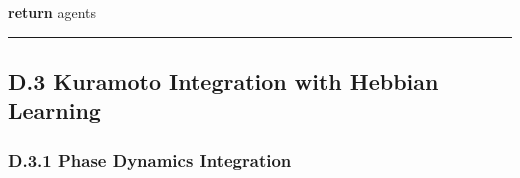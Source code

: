 \documentclass[
]{article}
\newenvironment{Shaded}{}{}
\newcommand{\ControlFlowTok}[1]{\textcolor[rgb]{0.00,0.44,0.13}{\textbf{#1}}}
\newcommand{\NormalTok}[1]{#1}
\begin{document}
\begin{Shaded}
\begin{Highlighting}[]
    \ControlFlowTok{return}\NormalTok{ agents}
\end{Highlighting}
\end{Shaded}

\begin{center}\rule{0.5\linewidth}{0.5pt}\end{center}

\subsection{D.3 Kuramoto Integration with Hebbian
Learning}\label{d.3-kuramoto-integration-with-hebbian-learning}

\subsubsection{D.3.1 Phase Dynamics
Integration}\label{d.3.1-phase-dynamics-integration}
\end{document}
